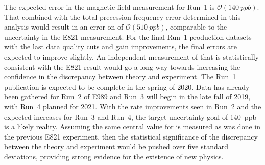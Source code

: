 The expected error in the magnetic field measurement for Run~1 is $\mathcal{O}(\SI{140}{ppb})$. That combined with the total precession frequency error determined in this analysis would result in an error on \amu of $\mathcal{O}(\SI{510}{ppb})$, comparable to the uncertainty in the E821 measurement. For the final Run~1 production datasets with the last data quality cuts and gain improvements, the final errors are expected to improve slightly. An independent measurement of \amu that is statistically consistent with the E821 result would go a long way towards increasing the confidence in the discrepancy between theory and experiment. The Run~1 publication is expected to be complete in the spring of 2020. Data has already been gathered for Run~2 of E989 and Run~3 will begin in the late fall of 2019, with Run~4 planned for 2021. With the rate improvements seen in Run~2 and the expected increases for Run~3 and Run~4, the target uncertainty goal of \SI{140}{ppb} is a likely reality. Assuming the same central value for \amu is measured as was done in the previous E821 experiment, then the statistical significance of the discrepancy between the theory and experiment would be pushed over five standard deviations, providing strong evidence for the existence of new physics.






